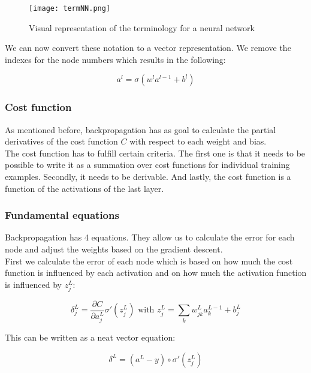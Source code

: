 \begin{figure}[H]
	\centering
	\texttt{[image: termNN.png]}
	\caption{Visual representation of the terminology for a neural network \cite{NNintro:online}}
	\label{fig:termNN}
\end{figure} 

We can now convert these notation to a vector representation. We remove the indexes for the node numbers which results in the following:

\begin{equation} 
a^l = \sigma (w^la^{l-1}+b^l)
\end{equation}

		\subsubsection{Cost function}
		
As mentioned before, backpropagation has as goal to calculate the partial derivatives of the cost function $C$ with respect to each weight and bias. \\
The cost function has to fulfill certain criteria. The first one is that it needs to be possible to write it as a summation over cost functions for individual training examples. Secondly, it needs to be derivable. And lastly, the cost function is a function of the activations of the last layer. 


		\subsubsection{Fundamental equations}

Backpropagation has 4 equations. They allow us to calculate the error for each node and adjust the weights based on the gradient descent. \\

First we calculate the error of each node which is based on how much the cost function is influenced by each activation and on how much the activation function is influenced by $z_j^L$:

\begin{equation} 
\delta^L_j = \frac{\partial C}{\partial a^L_j} \sigma'(z_j^L)
\text{ with }
z_j^L = \sum_k w^L_{jk}a^{L-1}_k+b^L_j
\end{equation}

This can be written as a neat vector equation:

\begin{equation} 
\delta^L = (a^L-y) \circ \sigma'(z_j^L)
\end{equation}

